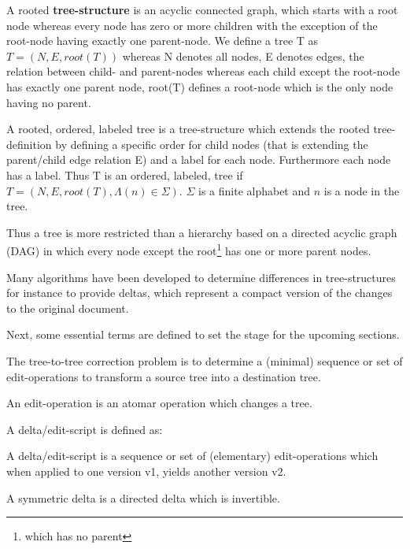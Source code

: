 \begin{mydef}
A rooted \textbf{tree-structure} is an acyclic connected graph, which starts with a root node whereas every node has zero or more children with the exception of the root-node having exactly one parent-node. We define a tree T as $T = (N, E, root(T))$ whereas N denotes all nodes, E denotes edges, the relation between child- and parent-nodes whereas each child except the root-node has exactly one parent node, root(T) defines a root-node which is the only node having no parent.
\end{mydef}

\begin{mydef}
A rooted, ordered, labeled tree is a tree-structure which extends the rooted tree-definition by defining a specific order for child nodes (that is extending the parent/child edge relation E) and a label for each node. Furthermore each node has a label. Thus T is an ordered, labeled, tree if $T = (N, E, root(T), \Lambda(n) \in \Sigma)$. $\Sigma$ is a finite alphabet and $n$ is a node in the tree.
\end{mydef}

Thus a tree is more restricted than a hierarchy based on a directed acyclic graph (DAG) in which every node except the root\footnote{which has no parent} has one or more parent nodes.

Many algorithms have been developed to determine differences in tree-structures for instance to provide deltas, which represent a compact version of the changes to the original document.

Next, some essential terms are defined to set the stage for the upcoming sections.

The tree-to-tree correction problem is to determine a (minimal) sequence or set of edit-operations to transform a source tree into a destination tree. 

\begin{mydef}
An edit-operation is an atomar operation which changes a tree.
\end{mydef}

A delta/edit-script is defined as:

\begin{mydef}
A delta/edit-script is a sequence or set of (elementary) edit-operations which when applied to one version v1, yields another version v2.
\end{mydef}

\begin{mydef}
A symmetric delta is a directed delta which is invertible.
\end{mydef}

